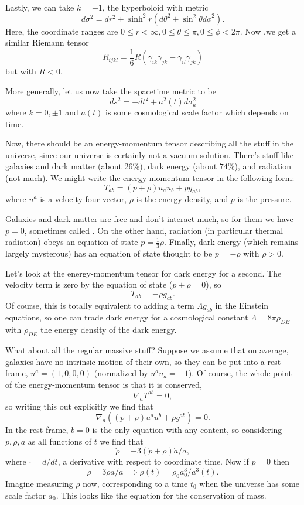 Lastly, we can take $k=-1$, the hyperboloid with metric $$d\sigma^2=dr^2+\sinh^2 r (d\theta^2 +\sin^2\theta d\phi^2).$$
Here, the coordinate ranges are $0\leq r < \infty, 0\leq \theta \leq \pi, 0\leq \phi < 2\pi.$ Now ,we get a similar Riemann tensor
$$R_{ijkl}=\frac{1}{6}R(\gamma_{ik}\gamma_{jk}-\gamma_{il}\gamma_{jk})$$
but with $R<0.$

More generally, let us now take the spacetime metric to be
$$ds^2=-dt^2+a^2(t) d\sigma_k^2$$
where $k=0,\pm 1$ and $a(t)$ is some cosmological scale factor which depends on time.

Now, there should be an energy-momentum tensor describing all the stuff in the universe, since our universe is certainly not a vacuum solution. There's stuff like galaxies and dark matter (about $26$\%), dark energy (about $74$\%), and radiation (not much). We might write the energy-momentum tensor in the following form:
$$T_{ab}=(p+\rho)u_a u_b +p g_{ab},$$
where $u^a$ is a velocity four-vector, $\rho$ is the energy density, and $p$ is the pressure.

Galaxies and dark matter are free and don't interact much, so for them we have $p=0$, sometimes called . On the other hand, radiation (in particular thermal radiation) obeys an equation of state $p=\frac{1}{3}\rho$. Finally, dark energy (which remains largely mysterous) has an equation of state thought to be $p=-\rho$ with $\rho>0$.

Let's look at the energy-momentum tensor for dark energy for a second. The velocity term is zero by the equation of state ($p+\rho=0$), so
$$T_{ab}=-\rho g_{ab}.$$
Of course, this is totally equivalent to adding a term $\Lambda g_{ab}$ in the Einstein equations, so one can trade dark energy for a cosmological constant $\Lambda=8\pi \rho_{DE}$ with $\rho_{DE}$ the energy density of the dark energy.

What about all the regular massive stuff? Suppose we assume that on average, galaxies have no intrinsic motion of their own, so they can be put into a rest frame, $u^a=(1,0,0,0)$ (normalized by $u^a u_a=-1$). Of course, the whole point of the energy-momentum tensor is that it is conserved,
$$\nabla_a T^{ab}=0,$$
so writing this out explicitly we find that
$$\nabla_a((p+\rho)u^a u^b + p g^{ab})=0.$$
In the rest frame, $b=0$ is the only equation with any content, so considering $p,\rho,a$ as all functions of $t$ we find that
$$\dot \rho=-3(\dot p+\rho)\dot a/a,$$
where $\cdot=d/dt$, a derivative with respect to coordinate time. Now if $p=0$ then
$$\dot \rho =3\rho \dot a/a \implies \rho(t)=\rho_0 a_0^3/a^3(t).$$
Imagine measuring $\rho$ now, corresponding to a time $t_0$ when the universe has some scale factor $a_0$. This looks like the equation for the conservation of mass.